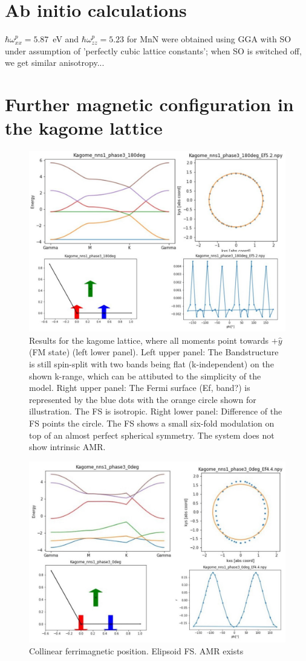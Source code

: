 \documentclass[prb,showpacs,amsmath,amssymb,superscriptaddress,twocolumn,floatfix]{revtex4-1}
\begin{document}
\begin{appendix}

\section{Ab initio calculations}

$\hbar\omega^p_{xx}=5.87$~eV and $\hbar\omega^p_{zz}=5.23$ for MnN
were obtained using GGA with SO under assumption of 'perfectly cubic
lattice constants'; when SO is switched off, we get  similar anisotropy...

\section{Further magnetic configuration in the kagome lattice}

\begin{figure}
	\centering
	\includegraphics[width=0.7\linewidth]{img_total/total_Kagome_phase3_180}
	\caption{Results for the kagome lattice, where all moments point towards $+\hat{y}$ (FM state) (left lower panel). Left upper panel: The Bandstructure is still spin-split with two bands being flat (k-independent) on the shown k-range, which can be attibuted to the simplicity of the model. Right upper panel: The Fermi surface {\color{red} (Ef, band?)} is represented by the blue dots with the orange circle shown for illustration. The FS is isotropic. Right lower panel: Difference of the FS points the circle. The FS shows a small six-fold modulation on top of an almost perfect spherical symmetry. The system does not show intrinsic AMR.}
	\label{fig:totalkagomephase3180}
\end{figure}

\begin{figure}
	\centering
	\includegraphics[width=0.7\linewidth]{img_total/total_Kagome_phase3_0}
	\caption{Collinear ferrimagnetic position. Elipsoid FS. AMR exists}
	\label{fig:totalkagomephase30}
\end{figure}


\end{appendix}
\end{document}

